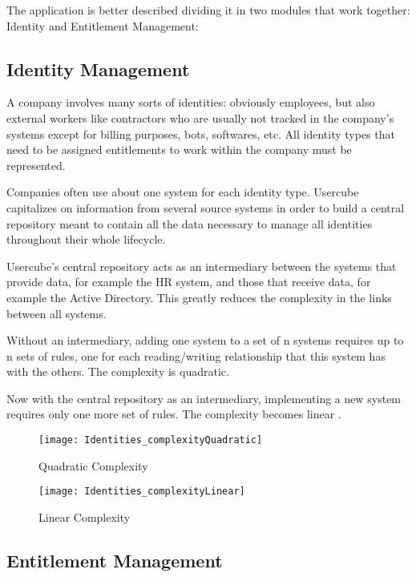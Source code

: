The application is better described dividing it in two modules that work together: Identity and Entitlement Management:

\subsection{Identity Management}


A company involves many sorts of identities: obviously employees, but also external workers like contractors who are usually not tracked in the company's systems except for billing purposes, bots, softwares, etc. All identity types that need to be assigned entitlements to work within the company must be represented.

Companies often use about one system for each identity type. Usercube capitalizes on information from several source systems in order to build a central repository meant to contain all the data necessary to manage all identities throughout their whole lifecycle.

Usercube's central repository acts as an intermediary between the systems that provide data, for example the HR system, and those that receive data, for example the Active Directory. This greatly reduces the complexity in the links between all systems.

Without an intermediary, adding one system to a set of n systems requires up to n sets of rules, one for each reading/writing relationship that this system has with the others. The complexity is quadratic.

Now with the central repository as an intermediary, implementing a new system requires only one more set of rules. The complexity becomes linear \cite{UsercubeDocument}.

\begin{figure}[htbp]
  \centering
  \begin{minipage}{0.48\textwidth}
    \texttt{[image: Identities\_complexityQuadratic]}
    \caption{Quadratic Complexity}
    \label{fig:Identities_complexityQuadratic}
  \end{minipage}\hfill
  \begin{minipage}{0.48\textwidth}
    \texttt{[image: Identities\_complexityLinear]}
    \caption{Linear Complexity}
    \label{fig:Identities_complexityLinear}
  \end{minipage}
\end{figure}


\subsection{Entitlement Management}


